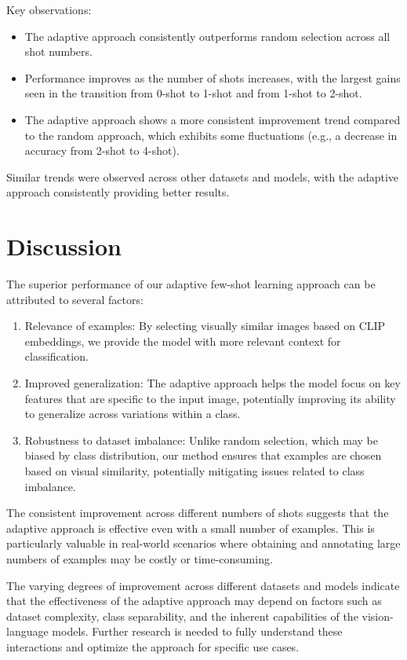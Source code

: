 \documentclass[12pt,a4paper]{article}
\begin{document}
Key observations:

\begin{itemize}
    \item The adaptive approach consistently outperforms random selection across all shot numbers.
    \item Performance improves as the number of shots increases, with the largest gains seen in the transition from 0-shot to 1-shot and from 1-shot to 2-shot.
    \item The adaptive approach shows a more consistent improvement trend compared to the random approach, which exhibits some fluctuations (e.g., a decrease in accuracy from 2-shot to 4-shot).
\end{itemize}

Similar trends were observed across other datasets and models, with the adaptive approach consistently providing better results.

\section{Discussion}

The superior performance of our adaptive few-shot learning approach can be attributed to several factors:

\begin{enumerate}
    \item Relevance of examples: By selecting visually similar images based on CLIP embeddings, we provide the model with more relevant context for classification.
    \item Improved generalization: The adaptive approach helps the model focus on key features that are specific to the input image, potentially improving its ability to generalize across variations within a class.
    \item Robustness to dataset imbalance: Unlike random selection, which may be biased by class distribution, our method ensures that examples are chosen based on visual similarity, potentially mitigating issues related to class imbalance.
\end{enumerate}

The consistent improvement across different numbers of shots suggests that the adaptive approach is effective even with a small number of examples. This is particularly valuable in real-world scenarios where obtaining and annotating large numbers of examples may be costly or time-consuming.

The varying degrees of improvement across different datasets and models indicate that the effectiveness of the adaptive approach may depend on factors such as dataset complexity, class separability, and the inherent capabilities of the vision-language models. Further research is needed to fully understand these interactions and optimize the approach for specific use cases.
\end{document}

